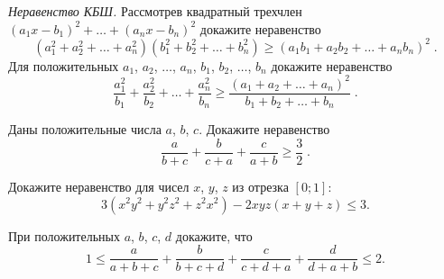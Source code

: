 \begin{problems}

\item
\sbp\emph{Неравенство КБШ.}
Рассмотрев квадратный трехчлен $(a_1 x - b_1)^2 + \ldots + (a_n x - b_n)^2$
докажите неравенство
\[
    (a_1^2 + a_2^2 + \ldots + a_n^2) (b_1^2 + b_2^2 + \ldots + b_n^2)
\geq
    (a_1 b_1 + a_2 b_2 + \ldots + a_n b_n)^2
\;.\]
\sbp
Для положительных
$a_1$, $a_2$, $\ldots$, $a_n$,
$b_1$, $b_2$, $\ldots$, $b_n$
докажите неравенство
\[
    \frac{a_1^2}{b_1} + \frac{a_2^2}{b_2} + \ldots + \frac{a_n^2}{b_n}
\geq
    \frac{(a_1 + a_2 + \ldots + a_n)^2}{b_1 + b_2 + \ldots + b_n}
\;.\]

\item
Даны положительные числа $a$, $b$, $c$.
Докажите неравенство
\[
    \frac{a}{b + c} + \frac{b}{c + a} + \frac{c}{a + b}
\geq
    \frac{3}{2}
\;.\]
    
\item
Докажите неравенство для чисел $x$, $y$, $z$ из отрезка $[0; 1]$:
\[
    3 (x^2 y^2 + y^2 z^2 + z^2 x^2) - 2 x y z (x + y + z)
\leq
    3
.\]

\item
При положительных $a$, $b$, $c$, $d$ докажите, что
\[
    1
\leq
    \frac{a}{a + b + c} + \frac{b}{b + c + d} +
    \frac{c}{c + d + a} + \frac{d}{d + a + b}
\leq
    2
.\]

\end{problems}

